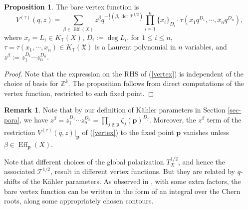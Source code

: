 \documentclass[10pt]{amsart}
\theoremstyle{definition}
\def\ZZ{{\mathbb{Z}}}
\def\TT{\mathbb{T}}
\newcommand{\bp}{\mathbf{p}}
\newcommand{\cT}{\mathcal{T}}
\newcommand{\Eff}{\operatorname{Eff}}
\newcommand{\fX}{\mathfrak{X}}
\theoremstyle{definition}
\newtheorem{Remark}[Definition]{Remark}
\numberwithin{equation}{section}
\theoremstyle{Theorem}
\newtheorem{Proposition}[Definition]{Proposition}
\begin{document}
\begin{Proposition} \label{Prop-vertex}
	The bare vertex function is
	\begin{equation} \label{vertex}
		V^{(\tau)}(q,z)  = \sum_{\beta \in \Eff(X)} z^\beta q^{-\frac{1}{2} (\beta,  \det \cT^{1/2}) } \prod_{i=1}^n \{ x_i \}_{D_i}  \cdot \tau ( x_1 q^{D_1}, \cdots,  x_n q^{D_n} ),
	\end{equation}
	where $x_i = L_i \in K_\TT (X)$, $D_i := \deg L_i$, for $1\leq i\leq n$, $\tau = \tau (x_1, \cdots, x_n) \in K_\TT (\fX)$ is a Laurent polynomial in $n$ variables, and $z^\beta := z_1^{D_1} \cdots z_n^{D_n}$.
\end{Proposition}

\begin{proof}
Note that the expression on the RHS of (\ref{vertex}) is independent of the choice of basis for $\ZZ^k$. The proposition follows from direct computations of the vertex function, restricted to each fixed point.
\end{proof}

\begin{Remark}
Note that by our definition of K\"ahler parameters in Section \ref{sec-para}, we have $z^\beta = z_1^{D_1} \cdots z_n^{D_n} = \prod_{j\not\in \bp} \zeta_j (\bp)^{D_j}$. Moreover, the $z^\beta$ term of the restriction $V^{(\tau)}(q,z) \big|_\bp$ of (\ref{vertex}) to the fixed point $\bp$ vanishes unless $\beta \in \Eff_\bp (X)$.
\end{Remark}

Note that different choices of the global  polarization $T^{1/2}_X$, and hence the associated $\cT^{1/2}$, result in different vertex functions. But they are related by $q$-shifts of the K\"ahler parameters. As observed in \cite{AOelliptic}, with some extra factors, the bare vertex function can be written in the form of an integral over the Chern roots, along some appropriately chosen contours.
\end{document}
